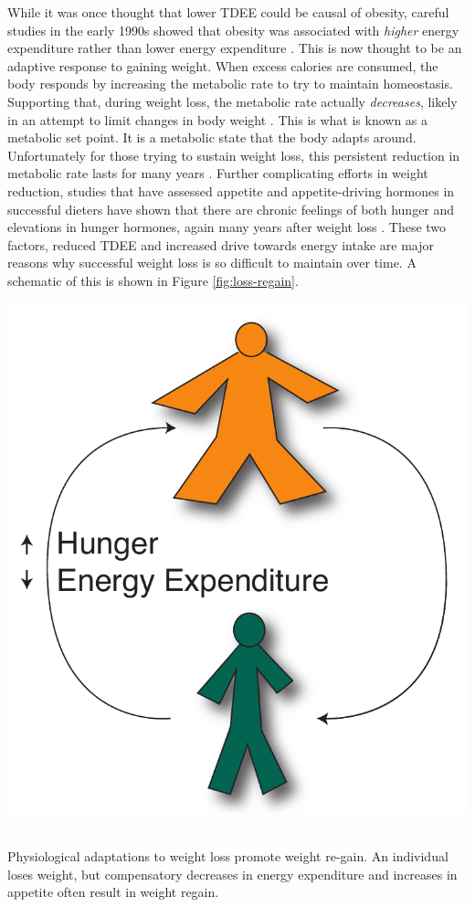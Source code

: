\documentclass{tufte-handout}
\begin{document}
While it was once thought that lower TDEE could be causal of obesity, careful studies in the early 1990s showed that obesity was associated with \emph{higher} energy expenditure rather than lower energy expenditure \citep{Ravussin1982}.  This is now thought to be an adaptive response to gaining weight.  When excess calories are consumed, the body responds by increasing the metabolic rate to try to maintain homeostasis.  Supporting that, during weight loss, the metabolic rate actually \emph{decreases}, likely in an attempt to limit changes in body weight \citep{Leibel1995a}.  This is what is known as a metabolic set point.  It is a metabolic state that the body adapts around.  Unfortunately for those trying to sustain weight loss, this persistent reduction in metabolic rate lasts for many years \citep{Rosenbaum2008}.  Further complicating efforts in weight reduction, studies that have assessed appetite and appetite-driving hormones in successful dieters have shown that there are chronic feelings of both hunger and elevations in hunger hormones, again many years after weight loss \citep{Sumithran2011}.  These two factors, reduced TDEE and increased drive towards energy intake are major reasons why successful weight loss is so difficult to maintain over time.  A schematic of this is shown in Figure \ref{fig:loss-regain}.

\begin{marginfigure}
\includegraphics{figures/Loss-Regain.pdf}\
\caption{Physiological adaptations to weight loss promote weight re-gain.  An individual loses weight, but compensatory decreases in energy expenditure and increases in appetite often result in weight regain.}
\label{fig:loss-regain}
\end{marginfigure}




\end{document}
